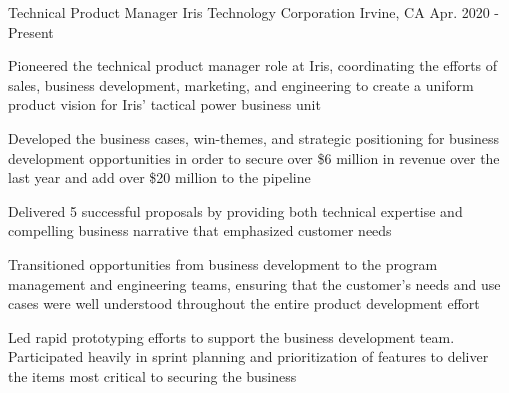 

\begin{cventries}

  \cventry
    {Technical Product Manager} %
    {Iris Technology Corporation} %
    {Irvine, CA} %
    {Apr. 2020 - Present} %
    {
      \begin{cvitems} %
        \item {Pioneered the technical product manager role at Iris, coordinating the efforts of sales, business development, marketing, and engineering to create a uniform product vision for Iris' tactical power business unit}
        \item {Developed the business cases, win-themes, and strategic positioning for business development opportunities in order to secure over \$6 million in revenue over the last year and add over \$20 million to the pipeline}
        \item {Delivered 5 successful proposals by providing both technical expertise and compelling business narrative that emphasized customer needs}
        \item {Transitioned opportunities from business development to the program management and engineering teams, ensuring that the customer's needs and use cases were well understood throughout the entire product development effort}
        \item {Led rapid prototyping efforts to support the business development team. Participated heavily in sprint planning and prioritization of features to deliver the items most critical to securing the business}
      \end{cvitems}
    }


\end{cventries}

